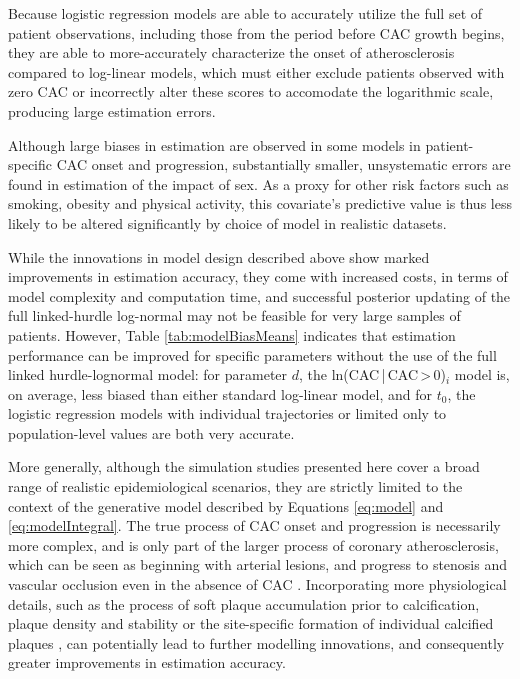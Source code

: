 \documentclass[a4paper, 10pt]{article}
\begin{document}
Because logistic regression models are able to accurately utilize the full set of patient observations, including those from the period before CAC growth begins, they are able to more-accurately characterize the onset of atherosclerosis compared to log-linear models, which must either exclude patients observed with zero CAC or incorrectly alter these scores to accomodate the logarithmic scale, producing large estimation errors.

Although large biases in estimation are observed in some models in patient-specific CAC onset and progression, substantially smaller, unsystematic errors are found in estimation of the impact of sex. As a proxy for other risk factors such as smoking, obesity and physical activity, this covariate's predictive value is thus less likely to be altered significantly by choice of model in realistic datasets.

While the innovations in model design described above show marked improvements in estimation accuracy, they come with increased costs, in terms of model complexity and computation time, and successful posterior updating of the full linked-hurdle log-normal may not be feasible for very large samples of patients. However, Table \ref{tab:modelBiasMeans} indicates that estimation performance can be improved for specific parameters without the use of the full linked hurdle-lognormal model: for parameter $d$, the ln(CAC\,|\,CAC\,>\,0)$_i$ model is, on average, less biased than either standard log-linear model, and for $t_0$, the logistic regression models with individual trajectories or limited only to population-level values are both very accurate.

More generally, although the simulation studies presented here cover a broad range of realistic epidemiological scenarios, they are strictly limited to the context of the generative model described by Equations \ref{eq:model} and \ref{eq:modelIntegral}. The true process of CAC onset and progression is necessarily more complex, and is only part of the larger process of coronary atherosclerosis, which can be seen as beginning with arterial lesions, and progress to stenosis and vascular occlusion even in the absence of CAC \cite{kelly2008angiography, gottlieb2010absence, nakahara2017calcification, gabriel2018zero}. Incorporating more physiological details, such as the process of soft plaque accumulation prior to calcification, plaque density and stability \cite{shioi2018plaque} or the site-specific formation of individual calcified plaques \cite{berman2016beyond}, can potentially lead to further modelling innovations, and consequently greater improvements in estimation accuracy.
\end{document}
